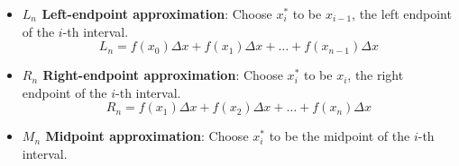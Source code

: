 \documentclass[../main.tex]{subfiles}
\begin{document}
\begin{itemize}[itemsep={2ex}]
  \item \textbf{\(L_{n}\) Left-endpoint approximation}: Choose \(x_{i}^{*}\) to be \(x_{i-1}\), the left endpoint of the \(i\)-th interval.
    \[
      L_{n} = f(x_{0}) \Delta x + f(x_{1}) \Delta x + \dots + f(x_{n-1}) \Delta x
    \]

    \begin{center}
      
      \qquad
      
      \qquad
      
    \end{center}

  \item \textbf{\(R_{n}\) Right-endpoint approximation}: Choose \(x_{i}^{*}\) to be \(x_{i}\), the right endpoint of the \(i\)-th interval.
    \[
      R_{n} = f(x_{1}) \Delta x + f(x_{2}) \Delta x + \dots + f(x_{n}) \Delta x
    \]

    \begin{center}
      
      \qquad
      
      \qquad
      
    \end{center}

  \item \textbf{\(M_{n}\) Midpoint approximation}: Choose \(x_{i}^{*}\) to be the midpoint of the \(i\)-th interval.

    \begin{center}
      
      \qquad
      
      \qquad
      
    \end{center}
\end{itemize}
\clearpage

%
\clearpage
\end{document}
